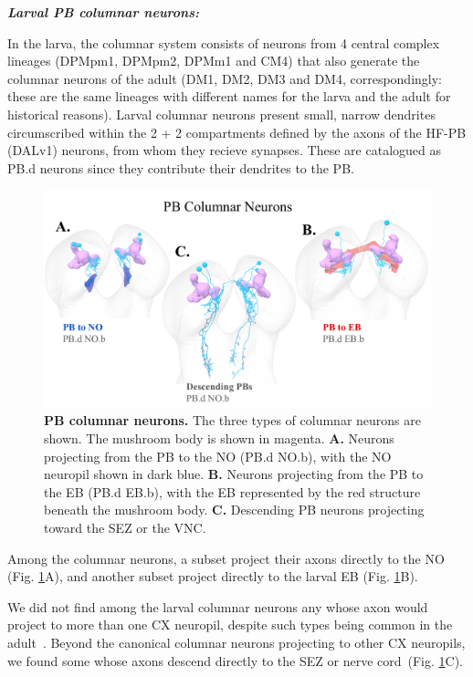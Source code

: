     \textbf{\textit{Larval PB columnar neurons:}}

    In the larva, the columnar system consists of neurons from 4 central complex lineages (DPMpm1, DPMpm2, DPMm1 and CM4) that also generate the columnar neurons of the adult (DM1, DM2, DM3 and DM4, correspondingly: these are the same lineages with different names for the larva and the adult for historical reasons).
    Larval columnar neurons present small, narrow dendrites circumscribed within the 2 + 2 compartments defined by the axons of the HF-PB (DALv1) neurons, from whom they recieve synapses. These are catalogued as PB.d neurons since they contribute their dendrites to the PB.

        \begin{figure}
            \centering
            \includegraphics[width=12cm]{Figs/CX/PBcolumnar.pdf}
            \caption[PB columnar neurons]{\textbf{PB columnar neurons.} The three types of columnar neurons are shown. The mushroom body is shown in magenta. \textbf{A.} Neurons projecting from the PB to the NO (PB.d NO.b), with the NO neuropil shown in dark blue. \textbf{B.} Neurons projecting from the PB to the EB (PB.d EB.b), with the EB represented by the red structure beneath the mushroom body. \textbf{C.} Descending PB neurons projecting toward the SEZ or the VNC.}
            \label{pbcolumnar}
        \end{figure}

    Among the columnar neurons, a subset project their axons directly to the NO (Fig. \ref{pbcolumnar}A), and another subset project directly to the larval EB (Fig. \ref{pbcolumnar}B).

    We did not find among the larval columnar neurons any whose axon would project to more than one CX neuropil, despite such types being common in the adult~\citep{wolff2015neuroarchitecture, wolff2018neuroarchitecture, hulse2021connectome}.
    Beyond the canonical columnar neurons projecting to other CX neuropils, we found some whose axons descend directly to the SEZ or nerve cord~(Fig. \ref{pbcolumnar}C).


